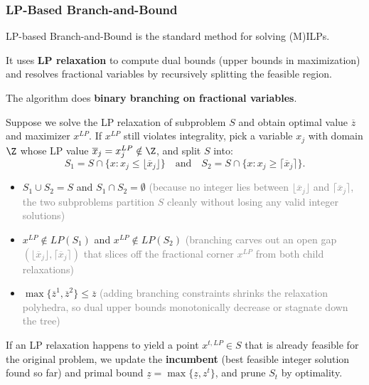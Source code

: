 \documentclass[a4paper, 11pt]{report}
\begin{document}
\subsubsection{LP-Based Branch-and-Bound}
LP-based Branch-and-Bound is the standard method for solving (M)ILPs. 

It uses \textbf{LP relaxation} to compute dual bounds (upper bounds in maximization) and resolves fractional variables by recursively splitting the feasible region.

The algorithm does \textbf{binary branching on fractional variables}.

Suppose we solve the LP relaxation of subproblem $S$ and obtain optimal value $\overline{z}$ and maximizer $x^{LP}$. If $x^{LP}$ still violates integrality, pick a variable $x_j$ with domain $\Z$ whose LP value $\overline{x}_j = x_j^{LP} \notin \Z$, and split $S$ into:
$$ S_1 = S \cap \{ x : x_j \leq \lfloor \overline{x}_j \rfloor \} \quad \text{and} \quad S_2 = S \cap \{ x : x_j \geq \lceil \overline{x}_j \rceil \}. $$
\begin{itemize}
    \item $S_1 \cup S_2 = S$ and $S_1 \cap S_2 = \emptyset$ \textcolor{gray}{(because no integer lies between $\lfloor \overline{x}_j \rfloor$ and $\lceil \overline{x}_j \rceil$, the two subproblems partition $S$ cleanly without losing any valid integer solutions)}
    \item $x^{LP} \notin LP(S_1)$ and $x^{LP} \notin LP(S_2)$ \textcolor{gray}{(branching carves out an open gap $(\lfloor \overline{x}_j \rfloor, \lceil \overline{x}_j \rceil)$ that slices off the fractional corner $x^{LP}$ from both child relaxations)}
    \item $\max\{\overline{z}^1, \overline{z}^2\} \leq \overline{z}$ \textcolor{gray}{(adding branching constraints shrinks the relaxation polyhedra, so dual upper bounds monotonically decrease or stagnate down the tree)}
\end{itemize}
If an LP relaxation happens to yield a point $x^{t,LP} \in S$ that is already feasible for the original problem, we update the \textbf{incumbent} (best feasible integer solution found so far) and primal bound $\underline{z} = \max\{\underline{z}, z^t\}$, and prune $S_t$ by optimality.
\end{document}
